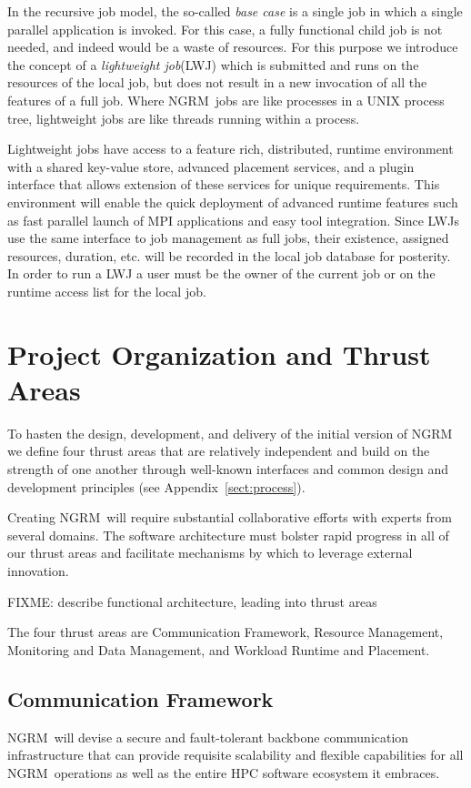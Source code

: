 \documentclass{article}
\newcommand{\ngrm}{NGRM}
\begin{document}
In the recursive job model, the so-called {\em base case} is a
single job in which a single parallel application is invoked. For
this case, a fully functional child job is not needed, and indeed
would be a waste of resources. For this purpose we introduce the
concept of a {\em lightweight job}(LWJ) which is submitted and
runs on the resources of the local job, but does not result in
a new invocation of all the features of a full job. Where
\ngrm\ jobs are like processes in a UNIX process tree, lightweight jobs
are like threads running within a process.

Lightweight jobs have access to a feature rich, distributed,
runtime environment with a shared key-value store, advanced
placement services, and a plugin interface that allows extension
of these services for unique requirements. This environment will
enable the quick deployment of advanced runtime features such as
fast parallel launch of MPI applications and easy tool integration.
Since LWJs use the same interface to job management as full
jobs, their existence, assigned resources, duration, etc.
will be recorded in the local job database for posterity.
In order to run a LWJ a user must be the owner of the current
job or on the runtime access list for the local job.


\section{Project Organization and Thrust Areas}
\label{sect:projorg}
To hasten the design, development, and delivery of the initial version
of \ngrm\, we define four thrust areas that are relatively independent
and build on the strength of one another through well-known interfaces
and common design and development principles (see Appendix~\ref{sect:process}).

Creating \ngrm\ will require substantial collaborative efforts with
experts from several domains.
The software architecture must bolster rapid progress in all of our thrust
areas and facilitate mechanisms by which to leverage external innovation.

FIXME: describe functional architecture, leading into thrust areas

The four thrust areas are
Communication Framework,
Resource Management,
Monitoring and Data Management,
and Workload Runtime and Placement.

\subsection{Communication Framework}
\ngrm\ will devise a secure and fault-tolerant backbone communication
infrastructure that can provide requisite scalability and flexible
capabilities for all \ngrm\ operations as well as the entire HPC
software ecosystem it embraces.
\end{document}
